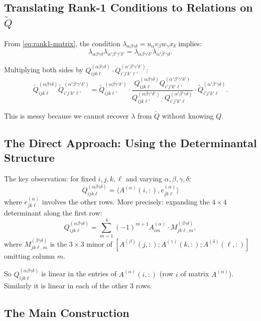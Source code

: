 \documentclass[12pt]{article}
\theoremstyle{definition}
\begin{document}
\subsection{Translating Rank-1 Conditions to Relations on $\tilde{Q}$}

From \eqref{eq:rank1-matrix}, the condition $\lambda_{\alpha\beta\gamma\delta} = u_\alpha v_\beta w_\gamma x_\delta$ implies:
$$\lambda_{\alpha\beta\gamma\delta}\lambda_{\alpha'\beta'\gamma'\delta'} = \lambda_{\alpha\beta\gamma'\delta'}\lambda_{\alpha'\beta'\gamma\delta}.$$

Multiplying both sides by $Q^{(\alpha\beta\gamma\delta)}_{ijk\ell}\cdot Q^{(\alpha'\beta'\gamma'\delta')}_{i'j'k'\ell'}$:
$$\tilde{Q}^{(\alpha\beta\gamma\delta)}_{ijk\ell}\tilde{Q}^{(\alpha'\beta'\gamma'\delta')}_{i'j'k'\ell'} = \tilde{Q}^{(\alpha\beta\gamma'\delta')}_{ijk\ell'}\cdot\frac{Q^{(\alpha\beta\gamma\delta)}_{ijk\ell}Q^{(\alpha'\beta'\gamma'\delta')}_{i'j'k'\ell'}}{Q^{(\alpha\beta\gamma'\delta')}_{ijk\ell'}\cdot Q^{(\alpha'\beta'\gamma\delta)}_{i'j'k'\ell}}\cdot\tilde{Q}^{(\alpha'\beta'\gamma\delta)}_{i'j'k'\ell}.$$

This is messy because we cannot recover $\lambda$ from $\tilde{Q}$ without knowing $Q$.

\subsection{The Direct Approach: Using the Determinantal Structure}

The key observation: for fixed $i,j,k,\ell$ and varying $\alpha,\beta,\gamma,\delta$:
$$Q^{(\alpha\beta\gamma\delta)}_{ijk\ell} = \langle A^{(\alpha)}(i,:), e^{(\alpha)}_{jk\ell}\rangle$$
where $e^{(\alpha)}_{jk\ell}$ involves the other rows. More precisely: expanding the $4\times 4$ determinant along the first row:
$$Q^{(\alpha\beta\gamma\delta)}_{ijk\ell} = \sum_{m=1}^4(-1)^{m+1}A^{(\alpha)}_{im}\cdot M^{(\beta\gamma\delta)}_{jk\ell,m},$$
where $M^{(\beta\gamma\delta)}_{jk\ell,m}$ is the $3\times 3$ minor of $[A^{(\beta)}(j,:);A^{(\gamma)}(k,:);A^{(\delta)}(\ell,:)]$ omitting column $m$.

So $Q^{(\alpha\beta\gamma\delta)}_{ijk\ell}$ is linear in the entries of $A^{(\alpha)}(i,:)$ (row $i$ of matrix $A^{(\alpha)}$). Similarly it is linear in each of the other 3 rows.

\subsection{The Main Construction}
\end{document}
